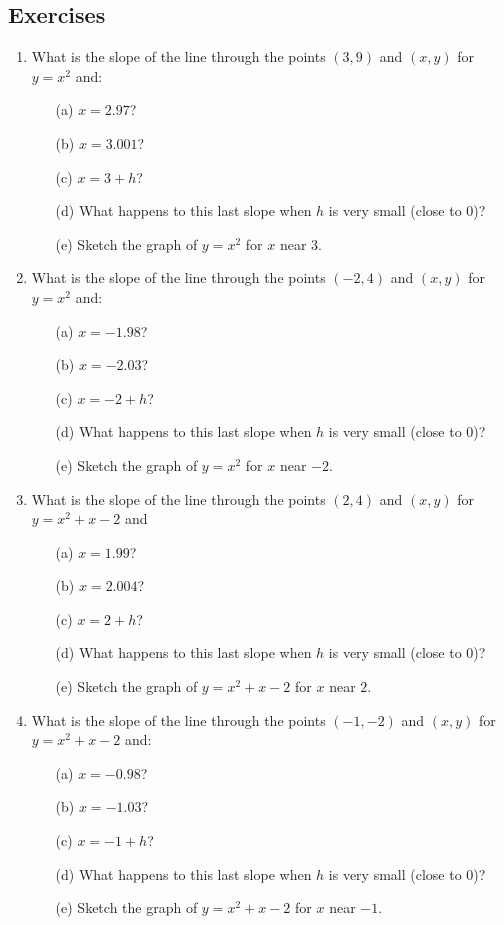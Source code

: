 \subsection{Exercises}
\label{2-2-exercies}

\begin{enumerate}
\item	What is the slope of the line through the points $(3,9)$  and  $(x, y)$  for $y = x^2$ and:
    \begin{itemize}
    \item[(a)] $x = 2.97$?   
    \item[(b)] $x = 3.001$?   
	\item[(c)] $x = 3+h$?   
    \item[(d)] What happens to this last slope when $h$  is very small (close to 0)?   
    \item[(e)] Sketch the graph of $y = x^2$  for  $x$  near  $3$.
    \end{itemize}

\item	What is the slope of the line through  the points $(-2,4)$  and  $(x, y)$  for $y = x^2$  and:
    \begin{itemize}
    \item[(a)] $x = -1.98$?   
    \item[(b)] $x = -2.03$?   
	\item[(c)] $x = -2+h$?   
    \item[(d)] What happens to this last slope when $h$  is very small (close to 0)?   
    \item[(e)] Sketch the graph of $y = x^2$  for  $x$  near  $-2$.
    \end{itemize}    
 
\item	What is the slope of the line through  the points $(2,4)$  and  $(x, y)$  for $y = x^2 + x - 2$   and  
\begin{itemize}
    \item[(a)] $x = 1.99$?   
    \item[(b)] $x = 2.004$?   
	\item[(c)] $x = 2+h$?   
    \item[(d)] What happens to this last slope when $h$  is very small (close to 0)?   
    \item[(e)] Sketch the graph of $y = x^2+x-2$  for  $x$  near  $2$.
    \end{itemize} 

\item	What is the slope of the line through the points $(-1,-2)$  and  $(x, y)$  for $y = x^2 +x - 2$  and:
\begin{itemize}
    \item[(a)] $x = -0.98$?   
    \item[(b)] $x = -1.03$?   
	\item[(c)] $x = -1+h$?   
    \item[(d)] What happens to this last slope when $h$  is very small (close to 0)?   
    \item[(e)] Sketch the graph of $y = x^2+x-2$  for  $x$  near  $-1$.
    \end{itemize} 


\end{enumerate}
